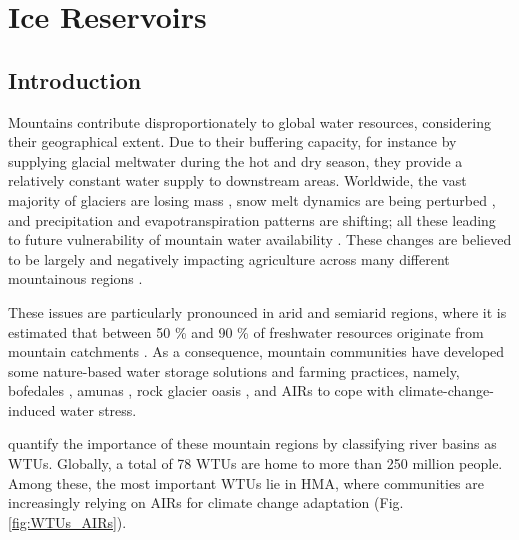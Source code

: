 \chapter{Ice Reservoirs}



\section{Introduction}

Mountains contribute disproportionately to global water resources, considering their geographical extent.
Due to their buffering capacity, for instance by supplying glacial meltwater during the hot and dry season,
they provide a relatively constant water supply to downstream areas. Worldwide, the vast majority of glaciers
are losing mass \citep{zempGlobalGlacierMass2019a}, snow melt dynamics are being perturbed
\citep{mukhopadhyayReevaluationSnowmeltGlacial2015, hammondGlobalSnowZone2018}, and precipitation and
evapotranspiration patterns are shifting; all these leading to future vulnerability of mountain water availability
\citep{lutzConsistentIncreaseHigh2014}. These changes are believed to be largely and negatively
impacting agriculture across many different mountainous regions \citep{ipccCrossChapterPaperMountains2022}.

These issues are particularly pronounced in arid and semiarid regions, where it is estimated that between 50 \%
and 90 \% of freshwater resources originate from mountain catchments
\citep{mukhopadhyayReevaluationSnowmeltGlacial2015, messerliMountainsWorldVulnerable2004}. As a consequence,
mountain communities have developed some nature-based water storage solutions and farming practices, namely,
bofedales \citep{monge-salazarEcohydrologyEcosystemServices2022}, amunas
\citep{ochoa-tocachiPotentialContributionsPreInca2019}, rock glacier oasis \citep{pandeyRockGlacierOasis2022},
and \ac{AIRs} \citep{wangchukIceStupaCompetition2020} to cope with climate-change-induced water stress.

\citet{immerzeelImportanceVulnerabilityWorld2020} quantify the importance of these mountain regions by
classifying river basins as \ac{WTUs}. Globally, a total of 78 \ac{WTUs} are home to more than 250 million
people. Among these, the most important WTUs lie in \ac{HMA}, where communities are increasingly relying on
\ac{AIRs} for climate change adaptation (Fig. \ref{fig:WTUs_AIRs}). 

